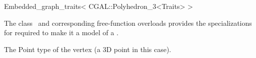

\begin{ccRefClass}{Embedded_graph_traits< CGAL::Polyhedron_3<Traits> >}


\ccDefinition

The class \ccRefName\ and corresponding free-function overloads 
provides the specializations for  
required to make it a model of a .


\ccTypes
  {The Point type of the vertex (a 3D point in this case).}

\ccIsModel
{}

\ccSeeAlso

\end{ccRefClass}



